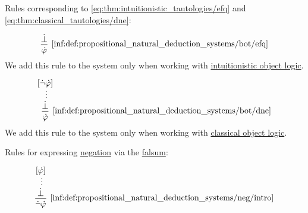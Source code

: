 \begin{definition}
\begin{thmenum}
     Rules corresponding to \eqref{eq:thm:intuitionistic_tautologies/efq} and \eqref{eq:thm:classical_tautologies/dne}:
    \begin{paracol}{2}
      \begin{leftcolumn}
        \leavevmode\vfill
        \begin{equation*}\taglabel[\logic{EFQ}]{inf:def:propositional_natural_deduction_systems/bot/efq}
          \begin{prooftree}
            \hypo{ \synbot }
            \infer1[\ref{inf:def:propositional_natural_deduction_systems/bot/efq}]{ \syn\varphi }
          \end{prooftree}
        \end{equation*}
        We add this rule to the system only when working with \hyperref[def:intuitionistic_logic]{intuitionistic object logic}.
      \end{leftcolumn}

      \begin{rightcolumn}
        \leavevmode\vfill
        \begin{equation*}\taglabel[\logic{DNE}]{inf:def:propositional_natural_deduction_systems/bot/dne}
          \begin{prooftree}
            \hypo{ [\synneg \syn\varphi] }
            \ellipsis {} { \synbot }
            \infer1[\ref{inf:def:propositional_natural_deduction_systems/bot/dne}]{ \syn\varphi }
          \end{prooftree}
        \end{equation*}
        We add this rule to the system only when working with \hyperref[def:classical_logic]{classical object logic}.
      \end{rightcolumn}
    \end{paracol}

     Rules for expressing \hyperref[def:propositional_alphabet/negation]{negation} via the \hyperref[def:propositional_alphabet/constants/falsum]{falsum}:
    \begin{paracol}{2}
      \begin{leftcolumn}
        \leavevmode\vfill
        \begin{equation*}\taglabel[\ensuremath{ \neg^+ }]{inf:def:propositional_natural_deduction_systems/neg/intro}
          \begin{prooftree}
            \hypo{ [\syn\varphi] }
            \ellipsis {} { \synbot }
            \infer1[\ref{inf:def:propositional_natural_deduction_systems/neg/intro}]{ \synneg \syn\varphi }
          \end{prooftree}
        \end{equation*}
      \end{leftcolumn}


\end{paracol}
\end{thmenum}
\end{definition}
